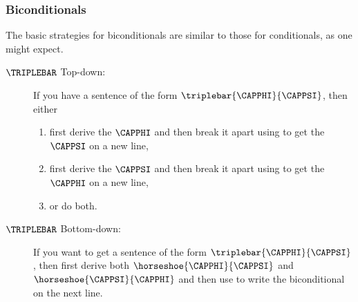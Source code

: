 \subsubsection*{Biconditionals}
The basic strategies for biconditionals are similar to those for conditionals, as one might expect.
\begin{description}
\item[$\TRIPLEBAR$ Top-down:] If you have a sentence of the form $\triplebar{\CAPPHI}{\CAPPSI}$, then either 
\begin{enumerate}
\item first derive the  $\CAPPHI$ and then break it apart using  to get the  $\CAPPSI$ on a new line,
\item first derive the  $\CAPPSI$ and then break it apart using  to get the  $\CAPPHI$ on a new line,
\item or do both.
\end{enumerate}
\item[$\TRIPLEBAR$ Bottom-down:] If you want to get a sentence of the form $\triplebar{\CAPPHI}{\CAPPSI}$, then first derive both $\horseshoe{\CAPPHI}{\CAPPSI}$ and $\horseshoe{\CAPPSI}{\CAPPHI}$ and then use  to write the biconditional on the next line.
\end{description}

